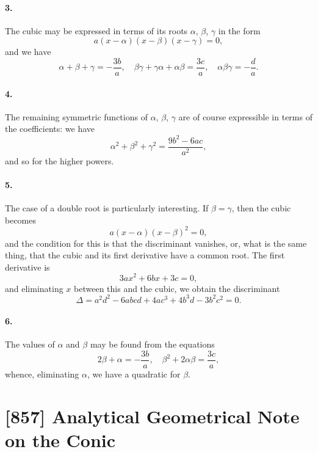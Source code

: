 \documentclass[11pt,a4paper]{book}
\begin{document}
\paragraph{3.} The cubic may be expressed in terms of its roots $\alpha$, $\beta$, $\gamma$ in the form
\[
a(x - \alpha)(x - \beta)(x - \gamma) = 0,
\]
and we have
\[
\alpha + \beta + \gamma = -\frac{3b}{a}, \quad \beta\gamma + \gamma\alpha + \alpha\beta = \frac{3c}{a}, \quad \alpha\beta\gamma = -\frac{d}{a}.
\]

\paragraph{4.} The remaining symmetric functions of $\alpha$, $\beta$, $\gamma$ are of course expressible in terms of the coefficients: we have
\[
\alpha^{2} + \beta^{2} + \gamma^{2} = \frac{9b^{2} - 6ac}{a^{2}},
\]
and so for the higher powers.

\paragraph{5.} The case of a double root is particularly interesting. If $\beta = \gamma$, then the cubic becomes
\[
a(x - \alpha)(x - \beta)^{2} = 0,
\]
and the condition for this is that the discriminant vanishes, or, what is the same thing, that the cubic and its first derivative have a common root. The first derivative is
\[
3ax^{2} + 6bx + 3c = 0,
\]
and eliminating $x$ between this and the cubic, we obtain the discriminant
\[
\Delta = a^{2}d^{2} - 6abcd + 4ac^{3} + 4b^{3}d - 3b^{2}c^{2} = 0.
\]

\paragraph{6.} The values of $\alpha$ and $\beta$ may be found from the equations
\[
2\beta + \alpha = -\frac{3b}{a}, \quad \beta^{2} + 2\alpha\beta = \frac{3c}{a},
\]
whence, eliminating $\alpha$, we have a quadratic for $\beta$.

\newpage
\section*{[857] Analytical Geometrical Note on the Conic}
\end{document}

